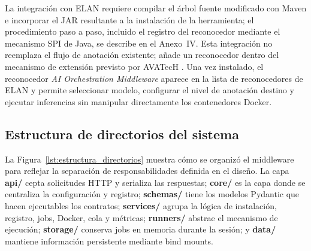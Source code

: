 \documentclass[11pt,a4paper]{article}
\begin{document}
La integración con ELAN requiere compilar el árbol fuente modificado con Maven e incorporar el JAR resultante a la instalación de la herramienta; el procedimiento paso a paso, incluido el registro del reconocedor mediante el mecanismo SPI de Java, se describe en el Anexo~IV. Esta integración no reemplaza el flujo de anotación existente; añade un reconocedor dentro del mecanismo de extensión previsto por AVATecH \cite{auer2014avatech}. Una vez instalado, el reconocedor \textit{AI Orchestration Middleware} aparece en la lista de reconocedores de ELAN y permite seleccionar modelo, configurar el nivel de anotación destino y ejecutar inferencias sin manipular directamente los contenedores Docker.


\subsection{Estructura de directorios del sistema}

La Figura~\ref{lst:estructura_directorios} muestra cómo se organizó el middleware para reflejar la separación de responsabilidades definida en el diseño. La capa \textbf{api/} cepta solicitudes HTTP y serializa las respuestas; \textbf{core/} es la capa donde se centraliza la configuración y registro; \textbf{schemas/} tiene los modelos Pydantic que hacen ejecutables los contratos; \textbf{services/} agrupa la lógica de instalación, registro, jobs, Docker, cola y métricas; \textbf{runners/} abstrae el mecanismo de ejecución; \textbf{storage/} conserva jobs en memoria durante la sesión; y \textbf{data/} mantiene información persistente mediante bind mounts.
\end{document}
